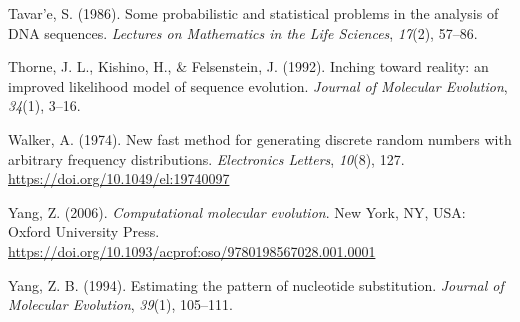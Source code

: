 \documentclass[12pt,]{article}
\begin{document}
\leavevmode\hypertarget{ref-Tavare_1986gtr}{}%
Tavar\a'e, S. (1986). Some probabilistic and statistical problems in the analysis of DNA sequences. \emph{Lectures on Mathematics in the Life Sciences}, \emph{17}(2), 57--86.

\leavevmode\hypertarget{ref-Thorne_1992}{}%
Thorne, J. L., Kishino, H., \& Felsenstein, J. (1992). Inching toward reality: an improved likelihood model of sequence evolution. \emph{Journal of Molecular Evolution}, \emph{34}(1), 3--16.

\leavevmode\hypertarget{ref-Walker_1974}{}%
Walker, A. (1974). New fast method for generating discrete random numbers with arbitrary frequency distributions. \emph{Electronics Letters}, \emph{10}(8), 127. \url{https://doi.org/10.1049/el:19740097}

\leavevmode\hypertarget{ref-Yang_2006}{}%
Yang, Z. (2006). \emph{Computational molecular evolution}. New York, NY, USA: Oxford University Press. \url{https://doi.org/10.1093/acprof:oso/9780198567028.001.0001}

\leavevmode\hypertarget{ref-Yang_1994}{}%
Yang, Z. B. (1994). Estimating the pattern of nucleotide substitution. \emph{Journal of Molecular Evolution}, \emph{39}(1), 105--111.
\end{document}
